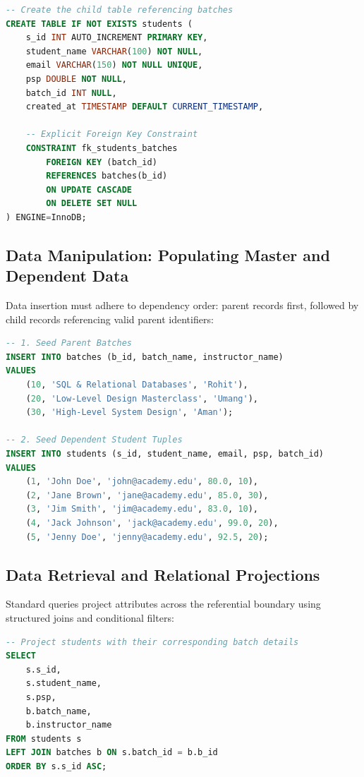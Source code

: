 \documentclass[10pt,journal,compsoc,onecolumn]{IEEEtran}
\begin{document}
\begin{lstlisting}[language=SQL]
-- Create the child table referencing batches
CREATE TABLE IF NOT EXISTS students (
    s_id INT AUTO_INCREMENT PRIMARY KEY,
    student_name VARCHAR(100) NOT NULL,
    email VARCHAR(150) NOT NULL UNIQUE,
    psp DOUBLE NOT NULL,
    batch_id INT NULL,
    created_at TIMESTAMP DEFAULT CURRENT_TIMESTAMP,
    
    -- Explicit Foreign Key Constraint
    CONSTRAINT fk_students_batches
        FOREIGN KEY (batch_id) 
        REFERENCES batches(b_id)
        ON UPDATE CASCADE
        ON DELETE SET NULL
) ENGINE=InnoDB;
\end{lstlisting}

\subsection{Data Manipulation: Populating Master and Dependent Data}
Data insertion must adhere to dependency order: parent records first, followed by child records referencing valid parent identifiers:

\begin{lstlisting}[language=SQL]
-- 1. Seed Parent Batches
INSERT INTO batches (b_id, batch_name, instructor_name) 
VALUES
    (10, 'SQL & Relational Databases', 'Rohit'),
    (20, 'Low-Level Design Masterclass', 'Umang'),
    (30, 'High-Level System Design', 'Aman');

-- 2. Seed Dependent Student Tuples
INSERT INTO students (s_id, student_name, email, psp, batch_id) 
VALUES
    (1, 'John Doe', 'john@academy.edu', 80.0, 10),
    (2, 'Jane Brown', 'jane@academy.edu', 85.0, 30),
    (3, 'Jim Smith', 'jim@academy.edu', 83.0, 10),
    (4, 'Jack Johnson', 'jack@academy.edu', 99.0, 20),
    (5, 'Jenny Doe', 'jenny@academy.edu', 92.5, 20);
\end{lstlisting}

\subsection{Data Retrieval and Relational Projections}
Standard queries project attributes across the referential boundary using structured joins and conditional filters:

\begin{lstlisting}[language=SQL]
-- Project students with their corresponding batch details
SELECT 
    s.s_id,
    s.student_name,
    s.psp,
    b.batch_name,
    b.instructor_name
FROM students s
LEFT JOIN batches b ON s.batch_id = b.b_id
ORDER BY s.s_id ASC;
\end{lstlisting}
\end{document}
